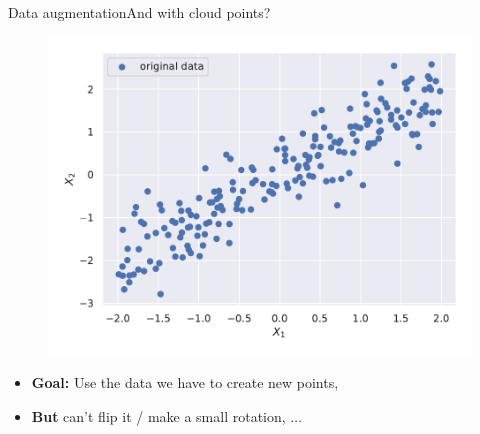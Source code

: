 \documentclass[10pt,aspectratio=43]{beamer}
\begin{document}
\begin{frame}{Data augmentation}{And with cloud points?}
    \begin{figure}
        \centering
        \includegraphics[scale=.5]{og_data_augm.pdf}
    \end{figure}
    \begin{itemize}
        \item \textbf{Goal:} Use the data we have to create new points,
        \item \textbf{But} can't flip it / make a small rotation, $\dots$
    \end{itemize}
\end{frame}
\end{document}
